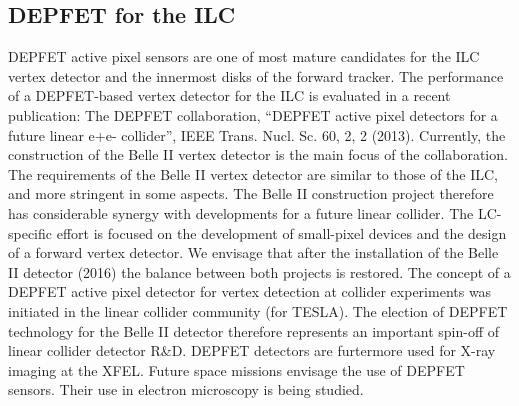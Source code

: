 \subsection{DEPFET for the ILC}
DEPFET active pixel sensors are one of most mature candidates for the ILC vertex detector and the innermost disks of the forward tracker. The performance of a DEPFET-based vertex detector for the ILC is evaluated in a recent publication:
The DEPFET collaboration, ``DEPFET active pixel detectors for a future linear e+e- collider'', IEEE Trans. Nucl. Sc. 60, 2, 2 (2013).
Currently, the construction of the Belle II vertex detector is the main focus of the collaboration. The requirements of the Belle II vertex detector are similar to those of the ILC, and more stringent in some aspects. The Belle II construction project therefore has considerable synergy with developments for a future linear collider. The LC-specific effort is focused on the development of small-pixel devices and the design of a forward vertex detector. We envisage that after the installation of the Belle II detector (2016) the balance between both projects is restored.
The concept of a DEPFET active pixel detector for vertex detection at collider experiments was initiated in the linear collider community (for TESLA). The election of DEPFET technology for the Belle II detector therefore represents an important spin-off of linear collider detector R\&D. DEPFET detectors are furtermore used for X-ray imaging at the XFEL. Future space missions envisage the use of DEPFET sensors. Their use in electron microscopy is being studied.

